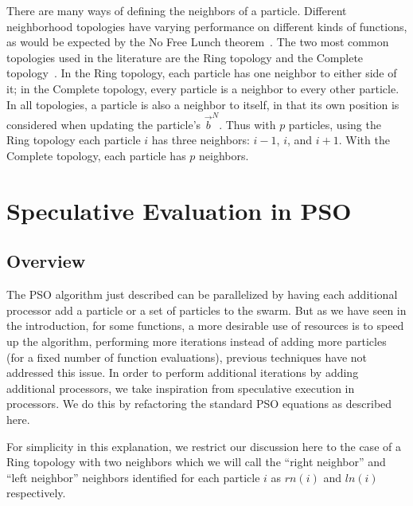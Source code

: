 \documentclass[journal,letterpaper]{IEEEtran}
\providecommand{\neigh}{\ensuremath{N}}
\providecommand{\nbest}{\ensuremath{\Vec{b}^\neigh}}
\providecommand{\ln}{\ensuremath{ln}}
\providecommand{\rn}{\ensuremath{rn}}
\begin{document}
There are many ways of defining the neighbors of a particle.  Different
neighborhood topologies have varying performance on different kinds of
functions, as would be expected by the No Free Lunch
theorem~\cite{wolpert-tec97}.
The two most common topologies used in the
literature are the Ring topology and the Complete
topology~\cite{bratton-sis07}.  In the Ring topology, each particle has one
neighbor to either side of it; in the Complete topology, every particle is a
neighbor to every other particle.  In all topologies, a particle is also a
neighbor to itself, in that its own position is considered when updating the
particle's $\nbest$.  Thus with $p$ particles, using the Ring topology each
particle $i$ has three neighbors: $i-1$, $i$, and $i+1$.  With the Complete
topology, each particle has $p$ neighbors.

\section{Speculative Evaluation in PSO}
\label{sec:sepso}
\subsection{Overview}

The PSO algorithm just described can be parallelized by having each additional
processor add a particle or a set of particles to the swarm.
But as we have seen in the introduction, for some
functions, a more desirable use of resources is to speed up the algorithm,
performing more iterations instead of adding more particles (for a fixed number of function evaluations),
previous techniques have not addressed this issue.
In order to perform additional iterations by adding additional processors, we
take inspiration from speculative execution in processors.
We do this by refactoring the standard PSO equations as described here.

For simplicity in this
explanation, we restrict our discussion here to the case of a Ring topology
with two neighbors which we will call the ``right neighbor'' and ``left
neighbor'' neighbors identified for each particle $i$ as $\rn(i)$ and $\ln(i)$
respectively.
\end{document}
